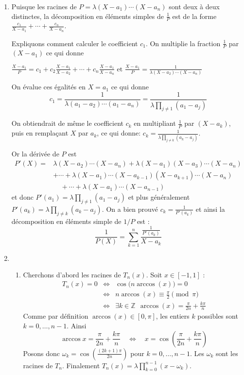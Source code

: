 \documentclass[11pt,a4paper]{article}
\newcommand{\Zz}{\mathbb{Z}} \newcommand{\Z}{\mathbb{Z}}
\begin{document}
\begin{enumerate}
\item Puisque les racines de $P=\lambda(X-a_1)\cdots(X-a_n)$ sont deux à deux distinctes, 
la décomposition en éléments simples de $\frac{1}{P}$ est de la forme 
$\frac{c_1}{X-a_1}+\cdots+\frac{c_n}{X-a_n}$. 

Expliquons comment calculer le coefficient $c_1$. On multiplie la fraction 
$\frac{1}{P}$ par $(X-a_1)$ ce qui donne  

$
\frac{X-a_1}{P} = c_1 + c_2 \frac{X-a_1}{X-a_2}+\cdots+ c_n \frac{X-a_1}{X-a_n}
\text{ et }
\frac{X-a_1}{P} = \frac{1}{\lambda(X-a_2)\cdots (X-a_n)}
$

On évalue ces égalités en $X=a_1$ ce qui donne
$$c_1 = \frac{1}{\lambda(a_1-a_2)\cdots (a_1-a_n)} = \frac{1}{\lambda\prod_{j\not= 1}(a_1-a_j)}$$

On obtiendrait de même le coefficient $c_k$ en multipliant $\frac{1}{P}$ par $(X-a_k)$,
puis en remplaçant $X$ par $a_k$, ce qui donne: $c_k=\frac{1}{\lambda\prod_{j\not= k}(a_k-a_j)}$.

Or la dérivée de $P$ est 
\begin{eqnarray*}
P'(X)=&\lambda(X-a_2)\cdots(X-a_n)+\lambda(X-a_1)(X-a_3)\cdots(X-a_n)\\
 &+\cdots+\lambda(X-a_1)\cdots(X-a_{k-1})(X-a_{k+1})\cdots(X-a_n)\\
 &\ \ \ \ \ +\cdots+\lambda(X-a_1)\cdots(X-a_{n-1})
\end{eqnarray*}
et donc $P'(a_1)=\lambda\prod_{j\not= 1}(a_1-a_j)$
et plus généralement $P'(a_k)=\lambda\prod_{j\not= k}(a_k-a_j)$. 
On a bien prouvé $c_k = \frac{1}{P'(a_k)}$ et ainsi la décomposition en éléments simple 
de $1/P$ est :
$$\frac{1}{P(X)}=\sum_{k=1}^n\frac{\frac{1}{P'(a_k)}}{X-a_k}$$

\item 
  \begin{enumerate}
    \item Cherchons d'abord les racines de $T_n(x)$.
Soit $x\in[-1,1]$ :
\begin{eqnarray*}
T_n(x)=0
  &\Longleftrightarrow& \cos\big(n \arccos(x)\big) = 0 \\
  &\Longleftrightarrow& n\arccos(x) \equiv \frac{\pi}{2} \pmod{\pi}\\
  &\Longleftrightarrow& \exists k\in\Zz\ \ \arccos(x)= \frac{\pi}{2n}+\frac{k\pi}{n}
\end{eqnarray*}
Comme par définition $\arccos(x) \in[0,\pi]$, les entiers $k$ possibles sont $k=0,\ldots,n-1$. Ainsi
$$\arccos x=\frac{\pi}{2n}+\frac{k\pi}{n} \quad \Longleftrightarrow \quad x=\cos\left(\frac{\pi}{2n}+\frac{k\pi}{n}\right)$$ 
Posons donc $\omega_k=\cos\left(\frac{(2k+1)\pi}{2n}\right)$ pour $k=0,\ldots,n-1$. 
Les $\omega_k$ sont les racines de $T_n$. Finalement $T_n(x)= \lambda \prod_{k=0}^{n-1}(x-\omega_k)$.


\end{enumerate}
\end{enumerate}
\end{document}
